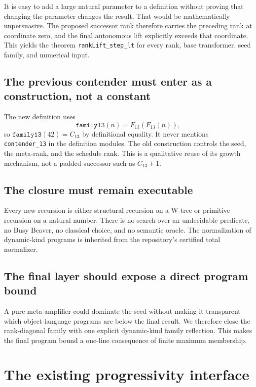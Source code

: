 \documentclass[11pt]{article}
\theoremstyle{definition}
\theoremstyle{remark}
\newcommand{\lean}[1]{\texttt{#1}}
\begin{document}
It is easy to add a large natural parameter to a definition without proving
that changing the parameter changes the result.  That would be mathematically
unpersuasive.  The proposed successor rank therefore carries the preceding
rank at coordinate zero, and the final autonomous lift explicitly exceeds that
coordinate.  This yields the theorem \lean{rankLift\_step\_lt} for every rank,
base transformer, seed family, and numerical input.

\subsection{The previous contender must enter as a construction, not a constant}

The new definition uses
\[
  \lean{family13}(n)=F_{13}(F_{13}(n)),
\]
so \(\lean{family13}(42)=C_{13}\) by definitional equality.  It never mentions
\lean{contender\_13} in the definition modules.  The old construction controls
the seed, the meta-rank, and the schedule rank.  This is a qualitative reuse of
its growth mechanism, not a padded successor such as \(C_{13}+1\).

\subsection{The closure must remain executable}

Every new recursion is either structural recursion on a W-tree or primitive
recursion on a natural number.  There is no search over an undecidable
predicate, no Busy Beaver, no classical choice, and no semantic oracle.  The
normalization of dynamic-kind programs is inherited from the repository's
certified total normalizer.

\subsection{The final layer should expose a direct program bound}

A pure meta-amplifier could dominate the seed without making it transparent
which object-language programs are below the final result.  We therefore close
the rank-diagonal family with one explicit dynamic-kind family reflection.
This makes the final program bound a one-line consequence of finite maximum
membership.

\section{The existing progressivity interface}
\end{document}
